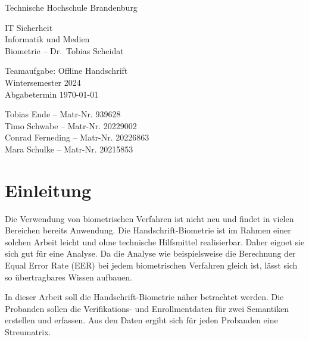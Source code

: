 \documentclass{article}
\begin{document}
\begin{titlepage}
	\begin{center}
		\begin{Large}
			Technische Hochschule Brandenburg \\[1em]
		\end{Large}
		
		IT Sicherheit \\
		Informatik und Medien \\
		Biometrie – Dr.\ Tobias Scheidat
	\end{center}
	
	\vfill

	\begin{center}
		\Large{Teamaufgabe: Offline Handschrift}\\[0.5em]
		\large{Wintersemester 2024}\\[0.25em]
		\large{Abgabetermin \today}
	\end{center}

	\vfill

	\begin{center}
		Tobias Ende – Matr-Nr. 939628 \\
		Timo Schwabe – Matr-Nr. 20229002 \\
		Conrad Ferneding – Matr-Nr. 20226863 \\
		Mara Schulke – Matr-Nr. 20215853 \\
	\end{center}
\end{titlepage}


\tableofcontents

\listoffigures


\section{Einleitung}

Die Verwendung von biometrischen Verfahren ist nicht neu und findet in vielen Bereichen bereits Anwendung.
Die Handschrift-Biometrie ist im Rahmen einer solchen Arbeit leicht und ohne technische Hilfsmittel
realisierbar. Daher eignet sie sich gut für eine Analyse. Da die Analyse wie beispielsweise die
Berechnung der Equal Error Rate (EER) bei jedem biometrischen Verfahren gleich ist, lässt sich so
übertragbares Wissen aufbauen.

In dieser Arbeit soll die Handschrift-Biometrie näher betrachtet werden. Die Probanden sollen die
Verifikations- und Enrollmentdaten für zwei Semantiken erstellen und erfassen. Aus den Daten ergibt
sich für jeden Probanden eine Streumatrix.
\end{document}
